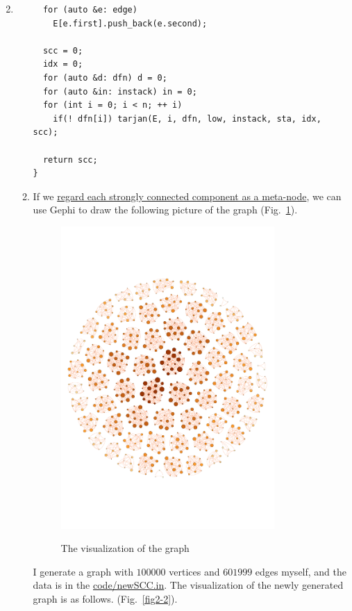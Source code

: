 \documentclass[12pt,a4paper]{article}
\makeatletter
\newtheorem*{solution}{Solution}
\theoremstyle{definition}
\renewenvironment{solution}[1][Solution] {\par\pushQED{\qed}\normalfont\topsep6\p@\@plus6\p@\relax\trivlist\item[\hskip\labelsep\bfseries#1\@addpunct{.}]\ignorespaces}{\popQED\endtrivlist\@endpefalse} \makeatother
\makeatother
\begin{document}
\begin{enumerate}
\begin{solution}
\begin{enumerate}
\begin{lstlisting}
  for (auto &e: edge)
    E[e.first].push_back(e.second);

  scc = 0;
  idx = 0;
  for (auto &d: dfn) d = 0;
  for (auto &in: instack) in = 0;
  for (int i = 0; i < n; ++ i)
    if(! dfn[i]) tarjan(E, i, dfn, low, instack, sta, idx, scc);

  return scc;
}
\end{lstlisting}
        \item If we \underline{regard each strongly connected component as a meta-node}, we can use Gephi to draw the following picture of the graph (Fig.~\ref{fig2-1}).
\begin{figure}[htbp]
  \centering
  \includegraphics[width=3.2in]{pics/prob2-1.pdf}\\
  \caption{The visualization of the graph}\label{fig2-1}
\end{figure}
    \clearpage
    I generate a graph with $100000$ vertices and $601999$ edges myself, and the data is in the \href{code/newSCC.in}{code/newSCC.in}. The visualization of the newly generated graph is as follows. (Fig.~\ref{fig2-2}).
\begin{figure}[htbp]
  \centering

\end{figure}
\end{enumerate}
\end{solution}
\end{enumerate}
\end{document}
